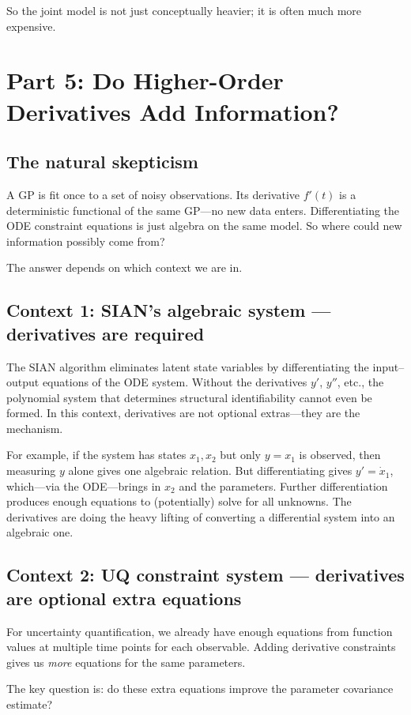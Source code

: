 \documentclass[11pt]{article}
\begin{document}
So the joint model is not just conceptually heavier; it is often much more expensive.

\section{Part 5: Do Higher-Order Derivatives Add Information?}

\subsection*{The natural skepticism}
A GP is fit once to a set of noisy observations. Its derivative $f'(t)$ is a deterministic functional of the same GP---no new data enters. Differentiating the ODE constraint equations is just algebra on the same model. So where could new information possibly come from?

The answer depends on which context we are in.

\subsection*{Context 1: SIAN's algebraic system --- derivatives are required}
The SIAN algorithm eliminates latent state variables by differentiating the input--output equations of the ODE system. Without the derivatives $y'$, $y''$, etc., the polynomial system that determines structural identifiability cannot even be formed. In this context, derivatives are not optional extras---they are the mechanism.

For example, if the system has states $x_1,x_2$ but only $y=x_1$ is observed, then measuring $y$ alone gives one algebraic relation. But differentiating gives $y'=\dot{x}_1$, which---via the ODE---brings in $x_2$ and the parameters. Further differentiation produces enough equations to (potentially) solve for all unknowns. The derivatives are doing the heavy lifting of converting a differential system into an algebraic one.

\subsection*{Context 2: UQ constraint system --- derivatives are optional extra equations}
For uncertainty quantification, we already have enough equations from function
values at multiple time points for each observable.
Adding derivative constraints gives us \emph{more} equations for the same parameters.

The key question is: do these extra equations improve the parameter covariance estimate?
\end{document}
